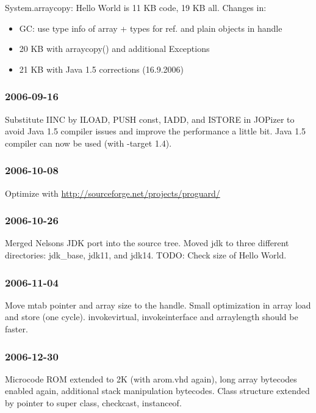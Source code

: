 \documentclass[a4paper,12pt]{scrartcl}
\newcommand{\code}[1]{{\textsf{#1}}}
\begin{document}
System.arraycopy: Hello World is 11 KB code, 19 KB all. Changes in:
\begin{itemize}
    \item GC: use type info of array + types for ref. and plain
    objects in handle
    \item 20 KB with arraycopy() and additional Exceptions
    \item 21 KB with Java 1.5 corrections (16.9.2006)
\end{itemize}

\subsubsection*{2006-09-16}

Substitute IINC by ILOAD, PUSH const, IADD, and ISTORE in JOPizer to
avoid Java 1.5 compiler issues and improve the performance a little
bit. Java 1.5 compiler can now be used (with -target 1.4).

\subsubsection*{2006-10-08}

Optimize with \url{http://sourceforge.net/projects/proguard/}

\subsubsection*{2006-10-26}

Merged Nelsons JDK port into the source tree. Moved \code{jdk} to
three different directories: \code{jdk\_base}, \code{jdk11}, and
\code{jdk14}. TODO: Check size of Hello World.

\subsubsection*{2006-11-04}

Move mtab pointer and array size to the handle. Small optimization
in array load and store (one cycle). invokevirtual, invokeinterface
and arraylength should be faster.

\subsubsection*{2006-12-30}

Microcode ROM extended to 2K (with arom.vhd again), long array
bytecodes enabled again, additional stack manipulation bytecodes.
Class structure extended by pointer to super class, checkcast,
instanceof.
\end{document}
